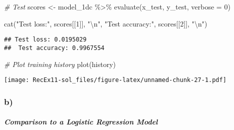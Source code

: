 \documentclass[
]{article}
\newenvironment{Shaded}{\begin{snugshade}}{\end{snugshade}}
\newcommand{\AttributeTok}[1]{\textcolor[rgb]{0.77,0.63,0.00}{#1}}
\newcommand{\CommentTok}[1]{\textcolor[rgb]{0.56,0.35,0.01}{\textit{#1}}}
\newcommand{\DecValTok}[1]{\textcolor[rgb]{0.00,0.00,0.81}{#1}}
\newcommand{\FunctionTok}[1]{\textcolor[rgb]{0.00,0.00,0.00}{#1}}
\newcommand{\NormalTok}[1]{#1}
\newcommand{\OtherTok}[1]{\textcolor[rgb]{0.56,0.35,0.01}{#1}}
\newcommand{\SpecialCharTok}[1]{\textcolor[rgb]{0.00,0.00,0.00}{#1}}
\newcommand{\StringTok}[1]{\textcolor[rgb]{0.31,0.60,0.02}{#1}}
\begin{document}
\begin{Shaded}
\begin{Highlighting}[]
\CommentTok{\# Test}
\NormalTok{scores }\OtherTok{\textless{}{-}}\NormalTok{ model\_1dc }\SpecialCharTok{\%\textgreater{}\%} \FunctionTok{evaluate}\NormalTok{(x\_test, y\_test, }\AttributeTok{verbose =} \DecValTok{0}\NormalTok{)}

\FunctionTok{cat}\NormalTok{(}\StringTok{"Test loss:"}\NormalTok{, scores[[}\DecValTok{1}\NormalTok{]], }\StringTok{"}\SpecialCharTok{\textbackslash{}n}\StringTok{"}\NormalTok{,}
    \StringTok{"Test accuracy:"}\NormalTok{, scores[[}\DecValTok{2}\NormalTok{]], }\StringTok{"}\SpecialCharTok{\textbackslash{}n}\StringTok{"}\NormalTok{)}
\end{Highlighting}
\end{Shaded}

\begin{verbatim}
## Test loss: 0.0195029 
##  Test accuracy: 0.9967554
\end{verbatim}

\begin{Shaded}
\begin{Highlighting}[]
\CommentTok{\# Plot training history}
\FunctionTok{plot}\NormalTok{(history)}
\end{Highlighting}
\end{Shaded}

\texttt{[image: RecEx11-sol\_files/figure-latex/unnamed-chunk-27-1.pdf]}

\hypertarget{b-4}{%
\subsubsection{b)}\label{b-4}}

\hypertarget{comparison-to-a-logistic-regression-model}{%
\subparagraph{Comparison to a Logistic Regression
Model}\label{comparison-to-a-logistic-regression-model}}
\end{document}
